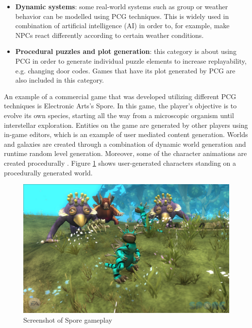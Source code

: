 \begin{itemize}
\item \textbf{Dynamic systems}: some real-world systems such as group or weather behavior can be modelled using PCG techniques. This is widely used in combination of artificial intelligence (AI) in order to, for example, make NPCs react differently according to certain weather conditions.

\item \textbf{Procedural puzzles and plot generation}: this category is about using PCG in order to generate individual puzzle elements to increase replayability, e.g. changing door codes. Games that have its plot generated by PCG are also included in this category.
\end{itemize}

An example of a commercial game that was developed utilizing different PCG techniques is Electronic Arts's Spore. In this game, the player's objective is to evolve its own species, starting all the way from a microscopic organism until interstellar exploration. Entities on the game are generated by other players using in-game editors, which is an example of user mediated content generation. Worlds and galaxies are created through a combination of dynamic world generation and runtime random level generation. Moreover, some of the character animations are created procedurally \cite{wright:2007}. Figure \ref{fig:spore} shows user-generated characters standing on a procedurally generated world.

\begin{figure}[h]
    \caption{Screenshot of Spore gameplay}
    \centerline{\includegraphics[width=13cm]{images/introduction/spore.jpg}}
    \label{fig:spore}
\end{figure}


